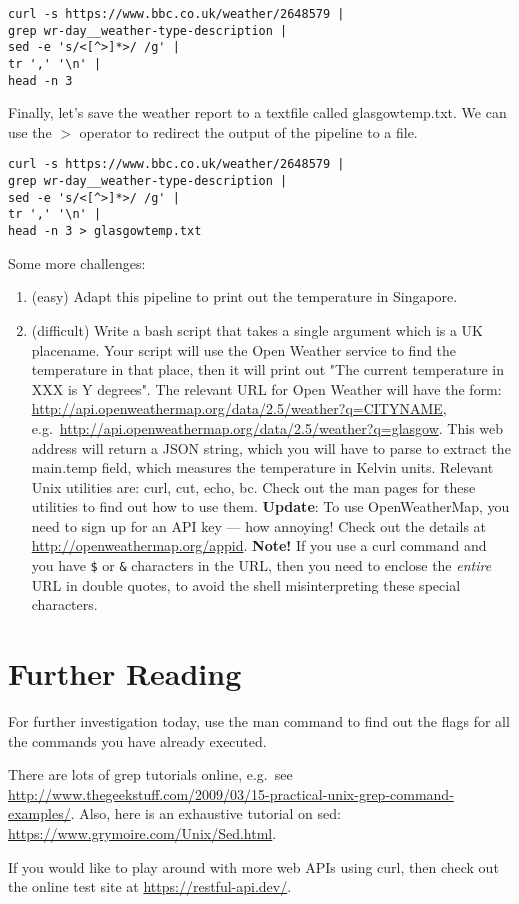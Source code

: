 \documentclass{article}
\begin{document}
\begin{lstlisting}[style=BashInputStyle]
curl -s https://www.bbc.co.uk/weather/2648579 | 
grep wr-day__weather-type-description |  
sed -e 's/<[^>]*>/ /g' | 
tr ',' '\n' | 
head -n 3
\end{lstlisting}


Finally, let's save the weather report to a textfile called glasgowtemp.txt. We can use the $>$  operator to redirect the output of the pipeline to a file.

\begin{lstlisting}[style=BashInputStyle]
curl -s https://www.bbc.co.uk/weather/2648579 | 
grep wr-day__weather-type-description |  
sed -e 's/<[^>]*>/ /g' | 
tr ',' '\n' | 
head -n 3 > glasgowtemp.txt
\end{lstlisting}

Some more challenges:
\begin{enumerate}
\item (easy) Adapt this pipeline to print out the temperature in Singapore.
\item (difficult) Write a bash script that takes a single argument which is a UK placename. Your script will use the Open Weather service to find the temperature in that place, then it will print out "The current temperature in XXX is Y degrees".
The relevant URL for Open Weather will have the form:
\url{http://api.openweathermap.org/data/2.5/weather?q=CITYNAME}, e.g.\
\url{http://api.openweathermap.org/data/2.5/weather?q=glasgow}.
This web address will return a JSON string, which you will have to parse to extract the main.temp field, which measures the temperature in Kelvin units.
Relevant Unix utilities are: \textsf{curl}, \textsf{cut}, \textsf{echo}, \textsf{bc}. Check out the man pages for these utilities to find out how to use them. \textbf{Update}: To use OpenWeatherMap, you need to sign up for an API key --- how annoying! Check out the details at \url{http://openweathermap.org/appid}. \textbf{Note!} If you use a curl command and you have \verb+$+ or \verb+&+ characters in the URL, then you need to enclose the \textit{entire} URL in double quotes, to avoid the shell misinterpreting these special characters.
\end{enumerate}

\section*{Further Reading}

For further investigation today, use the man command to find out 
the flags for all the commands you have already executed.

There are lots of grep tutorials online, e.g.\ see \url{http://www.thegeekstuff.com/2009/03/15-practical-unix-grep-command-examples/}.
Also, here is an exhaustive tutorial on sed: \url{https://www.grymoire.com/Unix/Sed.html}.

If you would like to play around with more web APIs using curl, then check out the online test site at \url{https://restful-api.dev/}.
\end{document}
